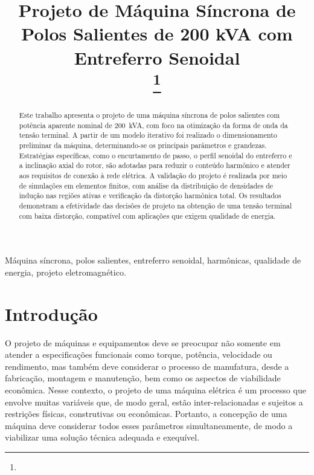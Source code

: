 \documentclass[conference]{IEEEtran}
\begin{document}
\title{Projeto de Máquina Síncrona de Polos Salientes de 200 kVA com Entreferro Senoidal\\
\thanks{}
}

\author{
}

\maketitle

\begin{abstract}
Este trabalho apresenta o projeto de uma máquina síncrona de polos salientes com potência aparente nominal de 200~kVA, com foco na otimização da forma de onda da tensão terminal. A partir de um modelo iterativo foi realizado o dimensionamento preliminar da máquina, determinando-se os principais parâmetros e grandezas. Estratégias específicas, como o encurtamento de passo, o perfil senoidal do entreferro e a inclinação axial do rotor, são adotadas para reduzir o conteúdo harmônico e atender aos requisitos de conexão à rede elétrica. A validação do projeto é realizada por meio de simulações em elementos finitos, com análise da distribuição de densidades de indução nas regiões ativas e verificação da distorção harmônica total. Os resultados demonstram a efetividade das decisões de projeto na obtenção de uma tensão terminal com baixa distorção, compatível com aplicações que exigem qualidade de energia.
\end{abstract}

\begin{IEEEkeywords}
Máquina síncrona, polos salientes, entreferro senoidal, harmônicas, qualidade de energia, projeto eletromagnético. 
\end{IEEEkeywords}

\section{Introdução}
O projeto de máquinas e equipamentos deve se preocupar não somente em atender a especificações funcionais como torque, potência, velocidade ou rendimento, mas também deve considerar o processo de manufatura, desde a fabricação, montagem e manutenção, bem como os aspectos de viabilidade econômica. Nesse contexto, o projeto de uma máquina elétrica é um processo que envolve muitas variáveis que, de modo geral, estão inter-relacionadas e sujeitos a restrições físicas, construtivas ou econômicas. Portanto, a concepção de uma máquina deve considerar todos esses parâmetros simultaneamente, de modo a viabilizar uma solução técnica adequada e exequível. 
\end{document}
